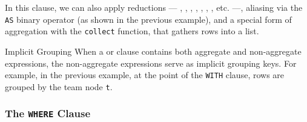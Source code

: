 \noindent
In this clause, we can also apply reductions --- , , , , , , , etc. ---, aliasing via the \texttt{AS} binary operator (as shown in the previous example), and a special form of aggregation with the \texttt{collect} function, that gathers rows into a list.

\begin{note}{Implicit Grouping}
    When a  or  clause contains both aggregate and non-aggregate expressions, the non-aggregate expressions serve as implicit grouping keys.
    For example, in the previous example, at the point of the \texttt{WITH} clause, rows are grouped by the team node \texttt{t}.
\end{note}

\subsubsection{The \texttt{WHERE} Clause}

